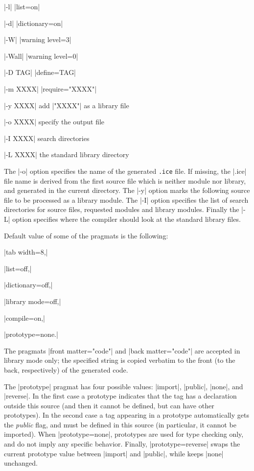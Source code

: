 \documentclass{article}
\newcommand\g[1]{\textsf{#1}}
\begin{document}
\smallskip

\HH \pp|-l| \HE \pp|list=on|

\HH \pp|-d| \HE \pp|dictionary=on|

\HH \pp|-W| \HE \pp|warning level=3|

\HH \pp|-Wall| \HE \pp|warning level=0|

\HH \pp|-D TAG| \HE \pp|define=TAG|

\HH \pp|-m XXXX| \HE \pp|require="XXXX"|

\HH \pp|-y XXXX| \HE add \pp|"XXXX"| as a library file

\HH \pp|-o XXXX| \HE specify the output file

\HH \pp|-I XXXX| \HE search directories

\HH \pp|-L XXXX| \HE the standard library directory

\smallskip
\noindent
The \pp|-o| option specifies the name of the generated \texttt{.ice} file.
If missing, the \pp|.ice| file name is derived from the first source file
which is neither module nor library, and generated in the current directory.
The \pp|-y| option marks the following source file to be processed as a
library module. The \pp|-I| option specifies the list of search
directories for source files, requested modules and library modules. Finally
the \pp|-L| option specifies where the compiler should look at the standard
library files.

Default value of some of the pragmats is the following:

\HH\pp|tab width=8,|\HE

\HH\pp|list=off,|\HE

\HH\pp|dictionary=off,|\HE

\HH\pp|library mode=off,|\HE

\HH\pp|compile=on,|\HE

\HH\pp|prototype=none.|\HE

\smallskip
The pragmats \pp|front matter="code"|  and \pp|back matter="code"| are
accepted in library mode only; the specified string is copied verbatim to
the front (to the back, respectively) of the generated code.

The \pp|prototype| pragmat has four possible values: \pp|import|,
\pp|public|, \pp|none|, and \pp|reverse|. In the first case a \g{prototype}
indicates that the tag has a declaration outside this source (and then it
cannot be defined, but can have other prototypes). In the second case a tag
appearing in a \g{prototype} automatically gets the \emph{public} flag, and
must be defined in this source (in particular, it cannot be imported). When
\pp|prototype=none|, prototypes are used for type checking only, and do
not imply any specific behavior. Finally, \pp|prototype=reverse| swaps the
current prototype value between \pp|import| and \pp|public|, while keeps
\pp|none| unchanged.
\end{document}
